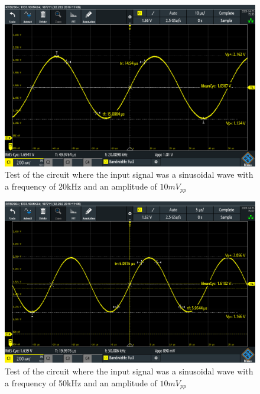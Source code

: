 \begin{figure}[h]
    \centering
    \includegraphics[width=1.0\textwidth]{graphics/20khz.PNG}
    \caption{Test of the circuit where the input signal was a sinusoidal wave with a frequency of 20kHz and an amplitude of $10mV_{pp}$}
    \label{fig:Cir20k}
\end{figure}

\begin{figure}[h]
    \centering
    \includegraphics[width=1.0\textwidth]{graphics/50khz.PNG}
    \caption{Test of the circuit where the input signal was a sinusoidal wave with a frequency of 50kHz and an amplitude of $10mV_{pp}$}
    \label{fig:Cir50k}
\end{figure}

